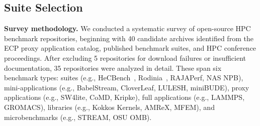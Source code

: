 \documentclass{article}
\begin{document}
\subsection{Suite Selection}
\label{sec:suite-selection}

\textbf{Survey methodology.} We conducted a systematic survey of open-source HPC benchmark repositories, beginning with 40 candidate archives identified from the ECP proxy application catalog, published benchmark suites, and HPC conference proceedings. After excluding 5 repositories for download failures or insufficient documentation, 35 repositories were analyzed in detail. These span six benchmark types: suites (e.g., HeCBench~\cite{HeCBench2023}, Rodinia~\cite{Rodinia2009}, RAJAPerf, NAS NPB), mini-applications (e.g., BabelStream, CloverLeaf, LULESH, miniBUDE), proxy applications (e.g., SW4lite, CoMD, Kripke), full applications (e.g., LAMMPS, GROMACS), libraries (e.g., Kokkos Kernels, AMReX, MFEM), and microbenchmarks (e.g., STREAM, OSU OMB).


\end{document}
